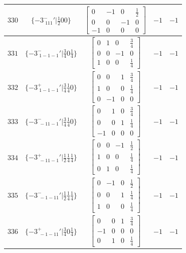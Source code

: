 \documentclass[fleqn,8pt]{jsarticle}
\begin{document}
\begin{longtable}{ccccc}
$ 330 $ & $ \{-3^{-}_{\,\,111}{}'|\frac{1}{2} 0 0\} $ & $ \begin{bmatrix} 0 & -1 & 0 & \frac{1}{2} \\ 0 & 0 & -1 & 0 \\ -1 & 0 & 0 & 0 \end{bmatrix} $ & $ -1 $ & $ -1 $ \\ \hline
$ 331 $ & $ \{-3^{-}_{\,\,1-1-1}{}'|\frac{3}{4} 0 \frac{1}{4}\} $ & $ \begin{bmatrix} 0 & 1 & 0 & \frac{3}{4} \\ 0 & 0 & -1 & 0 \\ 1 & 0 & 0 & \frac{1}{4} \end{bmatrix} $ & $ -1 $ & $ -1 $ \\ \hline
$ 332 $ & $ \{-3^{+}_{\,\,1-1-1}{}'|\frac{3}{4} \frac{1}{4} 0\} $ & $ \begin{bmatrix} 0 & 0 & 1 & \frac{3}{4} \\ 1 & 0 & 0 & \frac{1}{4} \\ 0 & -1 & 0 & 0 \end{bmatrix} $ & $ -1 $ & $ -1 $ \\ \hline
$ 333 $ & $ \{-3^{-}_{\,\,-11-1}{}'|\frac{3}{4} \frac{1}{4} 0\} $ & $ \begin{bmatrix} 0 & 1 & 0 & \frac{3}{4} \\ 0 & 0 & 1 & \frac{1}{4} \\ -1 & 0 & 0 & 0 \end{bmatrix} $ & $ -1 $ & $ -1 $ \\ \hline
$ 334 $ & $ \{-3^{+}_{\,\,-11-1}{}'|\frac{1}{2} \frac{1}{4} \frac{1}{4}\} $ & $ \begin{bmatrix} 0 & 0 & -1 & \frac{1}{2} \\ 1 & 0 & 0 & \frac{1}{4} \\ 0 & 1 & 0 & \frac{1}{4} \end{bmatrix} $ & $ -1 $ & $ -1 $ \\ \hline
$ 335 $ & $ \{-3^{-}_{\,\,-1-11}{}'|\frac{1}{2} \frac{1}{4} \frac{1}{4}\} $ & $ \begin{bmatrix} 0 & -1 & 0 & \frac{1}{2} \\ 0 & 0 & 1 & \frac{1}{4} \\ 1 & 0 & 0 & \frac{1}{4} \end{bmatrix} $ & $ -1 $ & $ -1 $ \\ \hline
$ 336 $ & $ \{-3^{+}_{\,\,-1-11}{}'|\frac{3}{4} 0 \frac{1}{4}\} $ & $ \begin{bmatrix} 0 & 0 & 1 & \frac{3}{4} \\ -1 & 0 & 0 & 0 \\ 0 & 1 & 0 & \frac{1}{4} \end{bmatrix} $ & $ -1 $ & $ -1 $ \\ \hline

\end{longtable}
\end{document}

